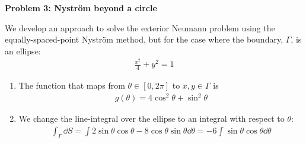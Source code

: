 \textbf{Problem 3: Nyström beyond a circle}

We develop an approach to solve the exterior Neumann problem using the equally-spaced-point Nyström method, but for the case where the boundary, $\Gamma$, is an ellipse:
\begin{align}
    \frac{x^2}{4}+ y^2 = 1
\end{align}

\begin{enumerate}[label=(\alph*),leftmargin=*,itemsep=0mm]
    
    \item The function that maps from $\theta\in[0,2\pi]$ to $x,y\in\Gamma$ is
    \begin{align}
        g(\theta) = 4\cos^2\theta + \sin^2\theta
    \end{align}
    
    \item We change the line-integral over the ellipse to an integral with respect to $\theta$:
    \begin{align}
        \int_\Gamma \dd{S} = \int 2\sin\theta\cos\theta-8\cos\theta\sin\theta \dd{\theta}
        = -6 \int\sin\theta\cos\theta\dd{\theta}
    \end{align}
    
\end{enumerate}